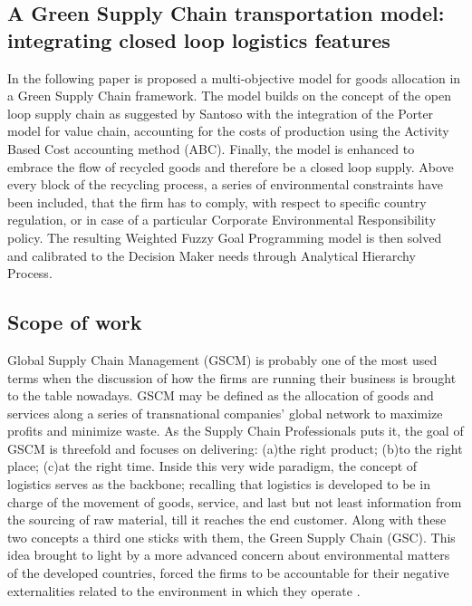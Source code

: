 \begin{doublespace}
\chapter{A Green Supply Chain transportation model: integrating closed loop logistics features}
In the following paper is proposed a multi-objective model for goods allocation in a Green Supply Chain framework. The model builds on the concept of the open loop supply chain as suggested by Santoso with the integration of the Porter model for value chain, accounting for the costs of production using the Activity Based Cost accounting method (ABC). Finally, the model is enhanced to embrace the flow of recycled goods and therefore be a closed loop supply. Above every block of the recycling process, a series of environmental constraints have been included, that the firm has to comply, with respect to specific country regulation, or in case of a particular Corporate Environmental Responsibility policy. The resulting Weighted Fuzzy Goal Programming model is then solved and calibrated to the Decision Maker needs through Analytical Hierarchy Process.

\section{Scope of work}
  Global Supply Chain Management (GSCM) is probably one of the most used terms when the discussion of how the firms are running their business is brought to the table nowadays. GSCM may be defined as the allocation of goods and services along a series of transnational companies' global network to maximize profits and minimize waste. As the Supply Chain Professionals puts it, the goal of GSCM is threefold and focuses on delivering: (a)the right product; (b)to the right place; (c)at the right time.
   Inside this very wide paradigm, the concept of logistics serves as the backbone; recalling that logistics is developed to be in charge of the movement of goods, service, and last but not least information from the sourcing of raw material, till it reaches the end customer.
  Along with these two concepts a third one sticks with them, the Green Supply Chain (GSC). This idea brought to light by a more advanced concern about environmental matters of the developed countries, forced the firms to be accountable for their negative externalities related to the environment in which they operate \cite{Srivastava2007}.


\end{doublespace}
